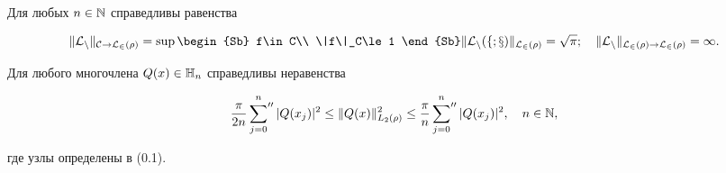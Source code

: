 \setcounter{cor}{0}





\begin{cor}


Для любых $n\in\Bbb{N}$ справедливы равенства


\begin{equation}


\|\cal L_n\|_{C\to L_2(\rho)}=


\sup\begin{Sb} f\in C\\ \|f\|_C\le 1 \end{Sb} \|\cal{L}_n(f;x)\|_{L_2(\rho)}


=\sqrt{\pi};\quad \|\rL_n\|_{L_2(\rho)\to L_2(\rho)}=\infty.


\end{equation}


\end{cor}








\begin{cor}


Для любого многочлена $Q(x)\in \Bbb{H}_n$ справедливы неравенства


\begin{equation}


\frac{\pi}{2n}\sideset{}{''}\sum_{j=0}^n|Q(x_j)|^2 \le \|Q(x)\|^2_{L_2(\rho)}\le


\frac{\pi}{n}\sideset{}{''}\sum_{j=0}^n|Q(x_j)|^2,\quad n\in\N,


\end{equation}


где узлы определены в (0.1).


\end{cor}








